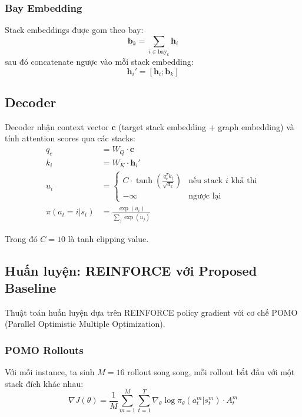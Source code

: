\documentclass[11pt,a4paper]{article}
\theoremstyle{definition}
\begin{document}
\subsubsection{Bay Embedding}

Stack embeddings được gom theo bay:
\begin{equation}
    \mathbf{b}_k = \sum_{i \in \text{bay}_k} \mathbf{h}_i
\end{equation}
sau đó concatenate ngược vào mỗi stack embedding:
\begin{equation}
    \mathbf{h}_i' = [\mathbf{h}_i; \mathbf{b}_k]
\end{equation}

\subsection{Decoder}

Decoder nhận context vector $\mathbf{c}$ (target stack embedding + graph embedding) và tính attention scores qua các stacks:
\begin{align}
    q_c &= W_Q \cdot \mathbf{c} \\
    k_i &= W_K \cdot \mathbf{h}_i' \\
    u_i &= \begin{cases}
        C \cdot \tanh\left(\frac{q_c^T k_i}{\sqrt{d_k}}\right) & \text{nếu stack $i$ khả thi} \\
        -\infty & \text{ngược lại}
    \end{cases} \\
    \pi(a_t = i | s_t) &= \frac{\exp(u_i)}{\sum_j \exp(u_j)}
\end{align}

Trong đó $C = 10$ là tanh clipping value.

\subsection{Huấn luyện: REINFORCE với Proposed Baseline}

Thuật toán huấn luyện dựa trên REINFORCE policy gradient với cơ chế POMO (Parallel Optimistic Multiple Optimization).

\subsubsection{POMO Rollouts}

Với mỗi instance, ta sinh $M = 16$ rollout song song, mỗi rollout bắt đầu với một stack đích khác nhau:
\begin{equation}
    \nabla J(\theta) = \frac{1}{M} \sum_{m=1}^M \sum_{t=1}^T \nabla_\theta \log \pi_\theta(a_t^m | s_t^m) \cdot A_t^m
\end{equation}
\end{document}

